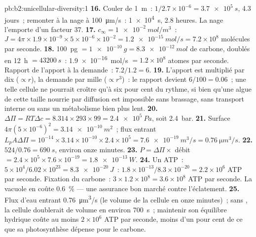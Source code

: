 \begin{solution}{pb:b2:unicellular-diversity:1}
\textbf{16.} Couler de \qty{1}{m}~: $1/2.7\times 10^{-6} =
\qty{3.7e5}{s}$, 4.3 jours~; remonter à la nage à \qty{100}{\micro m/s}~:
\qty{1e4}{s}, 2.8 heures. La nage l'emporte d'un facteur 37.
\textbf{17.} $c_\infty = \qty{1e-2}{mol/m^3}$~: $J = 4\pi\times
1.9\times 10^{-9}\times 5\times 10^{-6}\times 10^{-2} =
\qty{1.2e-15}{mol/s} = 7.2\times 10^8$ molécules par seconde.
\textbf{18.} \qty{100}{pg} $= \qty{1e-10}{g} = \qty{8.3e-12}{mol}$ de
carbone, doublés en \qty{12}{h} $= \qty{43200}{s}$~:
\qty{1.9e-16}{mol/s} $= 1.2\times 10^8$ atomes par seconde. Rapport de
l'apport à la demande~: $7.2/1.2 = 6$.
\textbf{19.} L'apport est multiplié par dix ($\propto r$), la demande
par mille ($\propto r^3$)~: le rapport devient $6/100 = 0.06$~; une
telle cellule ne pourrait croître qu'à six pour cent du rythme, si bien
qu'une algue de cette taille nourrie par diffusion est impossible sans
brassage, sans transport interne ou sans un métabolisme bien plus lent.
\textbf{20.} $\Delta\Pi = RT\Delta c = 8.314\times 293\times 99 =
\qty{2.4e5}{Pa}$, soit \qty{2.4}{bar}.
\textbf{21.} Surface $4\pi(5\times 10^{-6})^2 = \qty{3.14e-10}{m^2}$~;
flux entrant $L_p A\Delta\Pi = 10^{-14}\times 3.14\times 10^{-10}\times
2.4\times 10^5 = \qty{7.6e-19}{m^3/s} = \qty{0.76}{\micro m^3/s}$.
\textbf{22.} $524/0.76 = \qty{690}{s}$, environ onze minutes.
\textbf{23.} $P = \Delta\Pi\times$ débit $= 2.4\times 10^5\times
7.6\times 10^{-19} = \qty{1.8e-13}{W}$.
\textbf{24.} Un ATP~: $5\times 10^4/6.02\times 10^{23} =
\qty{8.3e-20}{J}$~: $1.8\times 10^{-13}/8.3\times 10^{-20} = 2.2\times
10^6$ ATP par seconde. Fixation du carbone~: $3\times 1.2\times 10^8 =
3.6\times 10^8$ ATP par seconde. La vacuole en coûte \qty{0.6}{\%}
--- une assurance bon marché contre l'éclatement.
\textbf{25.} Flux d'eau entrant \qty{0.76}{\micro m^3/s} (le volume de
la cellule en onze minutes)~; sans , la cellule
doublerait de volume en environ \qty{700}{s}~; maintenir son équilibre hydrique
coûte au moins $2\times 10^6$ ATP par seconde, moins d'un pour cent de
ce que sa photosynthèse dépense pour le carbone.
\end{solution}
